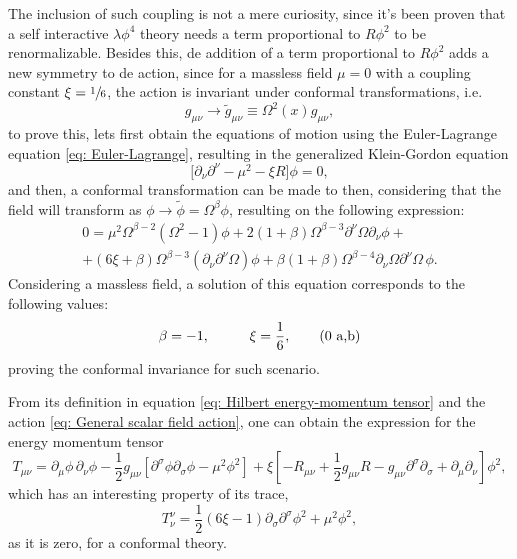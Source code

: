 The inclusion of such coupling is not a mere curiosity, since it's been proven \cite{Bunch_Renorm} that a self interactive $\lambda\phi^4$ theory needs a term proportional to $R\phi^2$ to be renormalizable. Besides this, de addition of a term proportional to $R\phi^2$ adds a new symmetry to de action, since for a massless field $\mu=0$ with a coupling constant $\xi=\sfrac{1}{6}$, the action is invariant under conformal transformations, i.e.
\begin{equation}\label{eq: Conformal Transformation}
	g_{\mu\nu}\rightarrow \tilde{g}_{\mu\nu}\equiv \Omega^2(x)g_{\mu\nu},
\end{equation}
to prove this, lets first obtain the equations of motion using the Euler-Lagrange equation \ref{eq: Euler-Lagrange}, resulting in the generalized Klein-Gordon equation
\begin{equation}\label{eq: Klein-Gordon General}
	\big[\partial_\nu\partial^\nu-\mu^2-\xi R\big]\phi=0,
\end{equation}
and then, a conformal transformation can be made to then, considering that the field will transform as $\phi\rightarrow\tilde{\phi}=\Omega^\beta\phi$, resulting on the following expression:
\begin{multline}
	0=\mu^2\Omega^{\beta-2}\left(\Omega^2-1\right)\phi+2\left(1+\beta\right)\Omega^{\beta-3}\partial^\nu\Omega\partial_\nu\phi+\\
	+(6\xi+\beta)\Omega^{\beta-3}\left(\partial_\nu\partial^\nu\Omega\right)\phi+\beta(1+\beta)\Omega^{\beta-4}\partial_\nu\Omega\partial^\nu\Omega\,\phi.
\end{multline}
Considering a massless field, a solution of this equation corresponds to the following values:
\begin{subequations}
	\begin{gather}
		\beta=-1,\hspace{1.0cm} \xi=\frac{1}{6},\tag{\theequation \,\,a,b}
	\end{gather}
\end{subequations}
proving the conformal invariance for such scenario.

From its definition in equation \ref{eq: Hilbert energy-momentum tensor} and the action \ref{eq: General scalar field action}, one can obtain the expression for the energy momentum tensor
\begin{equation}\label{eq: Energy-Momentum scalar}
	T_{\mu\nu}=\partial_\mu\phi\,\partial_\nu\phi -\frac{1}{2}g_{\mu\nu}\left[\partial^\sigma\phi\partial_\sigma\phi-\mu^2\phi^2\right]+\xi\left[-R_{\mu\nu}+\frac{1}{2}g_{\mu\nu}R-g_{\mu\nu}\partial^\sigma\partial_\sigma+\partial_\mu\partial_\nu\right]\phi^2,
\end{equation}
which has an interesting property of its trace,
\begin{equation}
	T^\nu_\nu=\frac{1}{2}\left(6\xi-1\right)\partial_\sigma\partial^\sigma\phi^2+\mu^2\phi^2,
\end{equation}
as it is zero, for a conformal theory.
